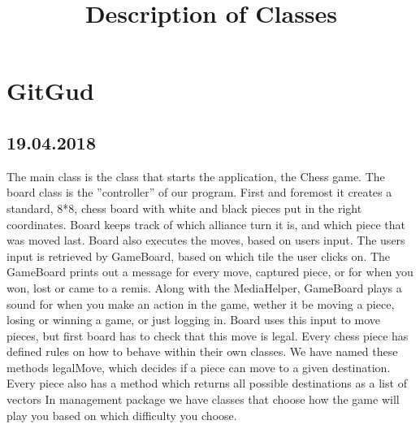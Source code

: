 \documentclass{article}
\begin{document}
\title{Description of Classes}
\section{GitGud}

\subsection{19.04.2018}
The main class is the class that starts the application, the Chess game.
The board class is the ”controller” of our program. First and foremost it creates a standard, 8*8, chess board with white and black pieces put in the right coordinates. 
Board keeps track of which alliance turn it is, and which piece that was moved last. Board also executes the moves, based on users input. 
The users input is retrieved by GameBoard, based on which tile the user clicks on. The GameBoard prints out a message for every move, captured piece, or for when you won, lost or came to a remis.
Along with the MediaHelper, GameBoard plays a sound for when you make an action in the game, wether it be moving a piece, losing or winning a game, or just logging in.
Board uses this input to move pieces, but ﬁrst board has to check that this move is legal. Every chess piece has deﬁned rules on how to behave within their own classes. 
We have named these methods legalMove, which decides if a piece can move to a given destination. 
Every piece also has a method which returns all possible destinations as a list of vectors
In management package we have classes that choose how the game will play you based on which difficulty you choose.
\end{document}
